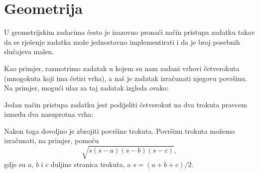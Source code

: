 \chapter{Geometrija}


U geometrijskim zadacima često je izazovno
pronaći način pristupa zadatku takav da se
rješenje zadatka može jednostavno implementirati
i da je broj posebnih slučajeva malen.

Kao primjer, razmotrimo zadatak u kojem
su nam zadani vrhovi četverokuta
(mnogokuta koji ima četiri vrha),
a naš je zadatak izračunati njegovu površinu.
Na primjer, mogući ulaz za taj zadatak izgleda ovako:

\begin{center}
\end{center}
Jedan način pristupa zadatku jest podijeliti
četverokut na dva trokuta pravcem
između dva nasuprotna vrha:
\begin{center}
\end{center}
Nakon toga dovoljno je zbrojiti površine
trokuta.
Površinu trokuta možemo izračunati,
na primjer, pomoću 
\[ \sqrt{s (s-a) (s-b) (s-c)},\]
gdje su $a$, $b$ i $c$ duljine
stranica trokuta, a
$s=(a+b+c)/2$.

